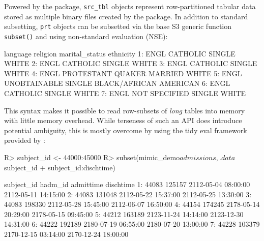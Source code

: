 \documentclass[
  notitle,
  nojss,
  noheadings]{jss}
\begin{document}
Powered by the  \citep{bennett2021} package, \texttt{src\_tbl}
objects represent row-partitioned tabular data stored as multiple binary
files created by the  \citep{klik2020} package. In addition to
standard subsetting, \texttt{prt} objects can be subsetted via the base
 S3 generic function \texttt{subset()} and using
non-standard evaluation (NSE):

\begin{CodeChunk}
\begin{CodeOutput}
   language          religion marital_status              ethnicity
1:     ENGL          CATHOLIC         SINGLE                  WHITE
2:     ENGL          CATHOLIC         SINGLE                  WHITE
3:     ENGL          CATHOLIC         SINGLE                  WHITE
4:     ENGL PROTESTANT QUAKER        MARRIED                  WHITE
5:     ENGL      UNOBTAINABLE         SINGLE BLACK/AFRICAN AMERICAN
6:     ENGL          CATHOLIC         SINGLE                  WHITE
7:     ENGL     NOT SPECIFIED         SINGLE                  WHITE
\end{CodeOutput}
\end{CodeChunk}

This syntax makes it possible to read row-subsets of \emph{long} tables
into memory with little memory overhead. While terseness of such an API
does introduce potential ambiguity, this is mostly overcome by using the
tidy eval framework provided by  \citep{wickham2020}:

\begin{CodeChunk}
\begin{CodeInput}
R> subject_id <- 44000:45000
R> subset(mimic_demo$admissions, .data$subject_id %
+        subject_id:dischtime)
\end{CodeInput}
\begin{CodeOutput}
   subject_id hadm_id           admittime           dischtime
1:      44083  125157 2112-05-04 08:00:00 2112-05-11 14:15:00
2:      44083  131048 2112-05-22 15:37:00 2112-05-25 13:30:00
3:      44083  198330 2112-05-28 15:45:00 2112-06-07 16:50:00
4:      44154  174245 2178-05-14 20:29:00 2178-05-15 09:45:00
5:      44212  163189 2123-11-24 14:14:00 2123-12-30 14:31:00
6:      44222  192189 2180-07-19 06:55:00 2180-07-20 13:00:00
7:      44228  103379 2170-12-15 03:14:00 2170-12-24 18:00:00
\end{CodeOutput}
\end{CodeChunk}
\end{document}
